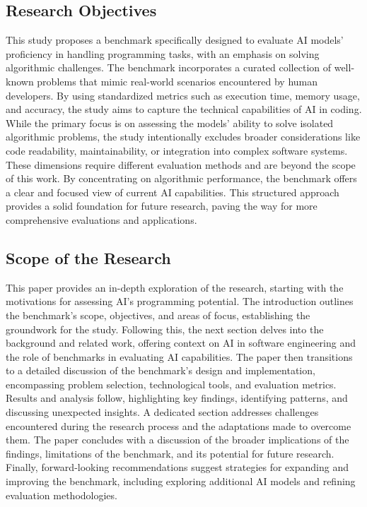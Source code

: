 \subsection{Research Objectives}
This study proposes a benchmark specifically designed to evaluate AI models' proficiency in handling programming tasks, with an emphasis on solving algorithmic challenges. The benchmark incorporates a curated collection of well-known problems that mimic real-world scenarios encountered by human developers. By using standardized metrics such as execution time, memory usage, and accuracy, the study aims to capture the technical capabilities of AI in coding. While the primary focus is on assessing the models’ ability to solve isolated algorithmic problems, the study intentionally excludes broader considerations like code readability, maintainability, or integration into complex software systems. These dimensions require different evaluation methods and are beyond the scope of this work. By concentrating on algorithmic performance, the benchmark offers a clear and focused view of current AI capabilities. This structured approach provides a solid foundation for future research, paving the way for more comprehensive evaluations and applications.
\subsection{Scope of the Research}
This paper provides an in-depth exploration of the research, starting with the motivations for assessing AI's programming potential. The introduction outlines the benchmark's scope, objectives, and areas of focus, establishing the groundwork for the study. Following this, the next section delves into the background and related work, offering context on AI in software engineering and the role of benchmarks in evaluating AI capabilities. The paper then transitions to a detailed discussion of the benchmark’s design and implementation, encompassing problem selection, technological tools, and evaluation metrics. Results and analysis follow, highlighting key findings, identifying patterns, and discussing unexpected insights. A dedicated section addresses challenges encountered during the research process and the adaptations made to overcome them. The paper concludes with a discussion of the broader implications of the findings, limitations of the benchmark, and its potential for future research. Finally, forward-looking recommendations suggest strategies for expanding and improving the benchmark, including exploring additional AI models and refining evaluation methodologies.